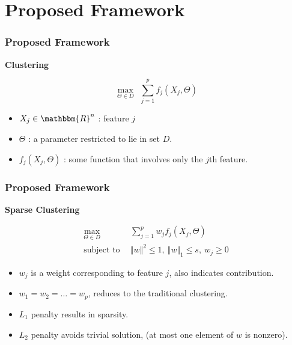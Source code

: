 \documentclass{beamer}
\begin{document}
\section{Proposed Framework}
\begin{frame}
\frametitle{Proposed Framework}
{\Large \bf Clustering}

\begin{equation*}
\max_{\Theta \in D}~~\sum_{j=1}^p f_j (X_j, \Theta)
\end{equation*}
\begin{itemize}
    \item $X_j \in \mathbbm{R}^n$ : feature $j$
    \item $\Theta$ : a parameter restricted to lie in set $D$.
    \item $f_j(X_j, \Theta)$ : some function that involves only the $j$th feature.
\end{itemize}
\end{frame}
\begin{frame}
\frametitle{Proposed Framework}
{\Large \bf Sparse Clustering}

\begin{eqnarray*}
\max_{\Theta \in D}&~~\sum_{j=1}^p w_jf_j (X_j, \Theta)\\
\text{subject to} &~~ \Vert w \Vert^2 \le 1,~\Vert w \Vert_1 \le s,~w_j \ge 0
\end{eqnarray*}
\begin{itemize}
    \item $w_j$ is a weight corresponding to feature $j$, also indicates contribution.
    \item $w_1=w_2=\ldots=w_p$, reduces to the traditional clustering.
    \item $L_1$ penalty results in sparsity.
    \item $L_2$ penalty avoids trivial solution, (at most one element of $w$ is nonzero).
\end{itemize}
\end{frame}
\end{document}
